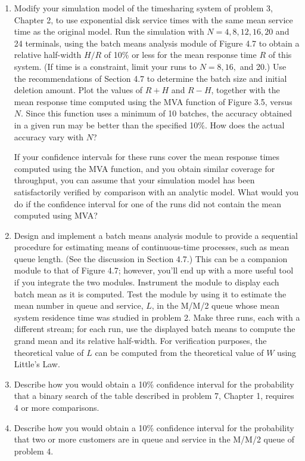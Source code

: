 \begin{enumerate}
  For comparison with your estimated means, the theoretical mean residence
  time in the M/M/2 queue is $T_s/(1-\rho^2)$, where $\rho = T_s/(2T_a)$.

\item Modify your simulation model of the timesharing system of problem 3,
  Chapter 2, to use exponential disk service times with the same mean service
  time as the original model. Run the simulation with $N = 4, 8, 12, 16, 20$ and
  24 terminals, using the batch means analysis module of Figure 4.7 to obtain a
  \noindent relative half-width $H/R$ of 10\% or less for the mean response time $R$ of
  this system. (If time is a constraint, limit your runs to $N = 8, 16,$ and
  20.) Use the recommendations of Section 4.7 to determine the batch size and
  initial deletion amount. Plot the values of $R+H$ and $R-H$, together with the
  mean response time computed using the MVA function of Figure 3.5, versus $N$.
  Since this function uses a minimum of 10 batches, the accuracy obtained in a
  given run may be better than the specified 10\%. How does the actual accuracy
  vary with $N$?

  If your confidence intervals for these runs cover the mean response times
  computed using the MVA function, and you obtain similar coverage for
  throughput, you can assume that your simulation model has been satisfactorily
  verified by comparison with an analytic model. What would you do if the
  confidence interval for one of the runs did not contain the mean computed
  using MVA?

\item Design and implement a batch means analysis module to provide a
  sequential procedure for estimating means of continuous-time processes, such
  as mean queue length. (See the discussion in Section 4.7.) This can be a
  companion module to that of Figure 4.7; however, you'll end up with a more
  useful tool if you integrate the two modules. Instrument the module to
  display each batch mean as it is computed. Test the module by using it to
  estimate the mean number in queue and service, $L$, in the M/M/2 queue whose
  mean system residence time was studied in problem 2. Make three runs, each
  with a different stream; for each run, use the displayed batch means to
  compute the grand mean and its relative half-width. For verification
  purposes, the theoretical value of $L$ can be computed from the theoretical
  value of $W$ using Little's Law.

\item Describe how you would obtain a 10\% confidence interval for the
  probability that a binary search of the table described in problem 7,
  Chapter 1, requires 4 or more comparisons.

\item Describe how you would obtain a 10\% confidence interval for the
  probability that two or more customers are in queue and service in the M/M/2
  queue of problem 4.
\end{enumerate}
